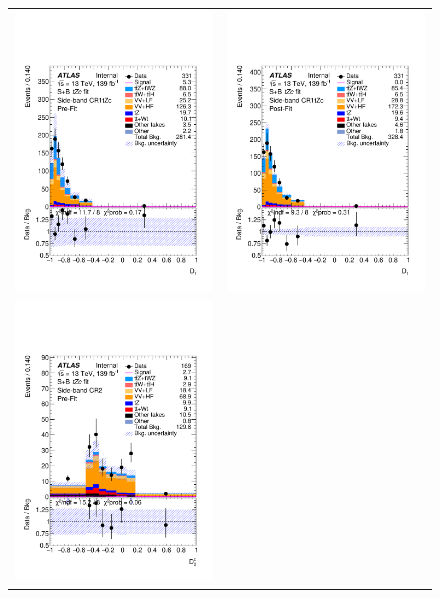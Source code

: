 \begin{figure}[htbp]
	\centering
	\begin{tabular}{cc}
		\includegraphics[width=.45\textwidth]{Appendices/AP8/figures/SPLUSB_CRSR_UsingSMTFullSys/Plots/SBCR1} &
		\includegraphics[width=.45\textwidth]{Appendices/AP8/figures/SPLUSB_CRSR_UsingSMTFullSys/Plots/SBCR1_postFit} \\
		\includegraphics[width=.45\textwidth]{Appendices/AP8/figures/SPLUSB_CRSR_UsingSMTFullSys/Plots/SBCR2} &

\end{tabular}
\end{figure}
